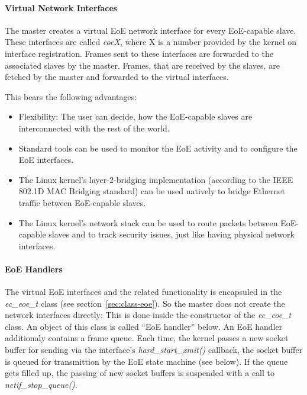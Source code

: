 \documentclass[a4paper,12pt,BCOR6mm,bibtotoc,idxtotoc]{scrbook}
\begin{document}
\paragraph{Virtual Network Interfaces}

The master creates a virtual EoE network interface for every
EoE-capable slave. These interfaces are called \textit{eoeX}, where X
is a number provided by the kernel on interface registration. Frames
sent to these interfaces are forwarded to the associated slaves by the
master. Frames, that are received by the slaves, are fetched by the
master and forwarded to the virtual interfaces.

This bears the following advantages:

\begin{itemize}
\item Flexibility: The user can decide, how the EoE-capable slaves are
  interconnected with the rest of the world.
\item Standard tools can be used to monitor the EoE activity and to
  configure the EoE interfaces.
\item The Linux kernel's layer-2-bridging implementation (according to
  the IEEE 802.1D MAC Bridging standard) can be used natively to
  bridge Ethernet traffic between EoE-capable slaves.
\item The Linux kernel's network stack can be used to route packets
  between EoE-capable slaves and to track security issues, just like
  having physical network interfaces.
\end{itemize}

\paragraph{EoE Handlers}

The virtual EoE interfaces and the related functionality is encapsuled
in the \textit{ec\_eoe\_t} class (see section~\ref{sec:class-eoe}).
So the master does not create the network interfaces directly: This is
done inside the constructor of the \textit{ec\_eoe\_t} class. An
object of this class is called ``EoE handler'' below. An EoE handler
additionaly contains a frame queue. Each time, the kernel passes a new
socket buffer for sending via the interface's
\textit{hard\_start\_xmit()} callback, the socket buffer is queued for
transmittion by the EoE state machine (see below). If the queue gets
filled up, the passing of new socket buffers is suspended with a call
to \textit{netif\_stop\_queue()}.
\end{document}
